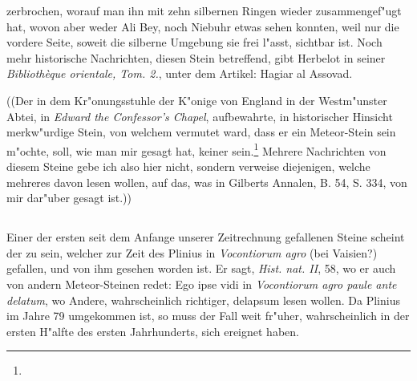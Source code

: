\documentclass[a4paper, 11pt, oneside, polutonikogreek, german]{article}
\begin{document}
zerbrochen, worauf man ihn mit zehn silbernen Ringen wieder zusammengef"ugt hat, wovon aber weder Ali Bey, noch Niebuhr etwas sehen konnten, weil nur die vordere Seite, soweit die silberne Umgebung sie frei l"asst, sichtbar ist. Noch mehr historische Nachrichten, diesen Stein betreffend, gibt Herbelot in seiner \emph{Bibliothèque orientale, Tom. 2.}, unter dem Artikel: Hagiar al Assovad.

((Der in dem Kr"onungsstuhle der K"onige von England in der Westm"unster Abtei, in \emph{Edward the Confessor's Chapel}, aufbewahrte, in historischer Hinsicht merkw"urdige Stein, von welchem vermutet ward, dass er ein Meteor-Stein sein m"ochte, soll, wie man mir gesagt hat, keiner sein.\footnote{} Mehrere Nachrichten von diesem Steine gebe ich also hier nicht, sondern verweise diejenigen, welche mehreres davon lesen wollen, auf das, was in Gilberts Annalen, B. 54, S. 334, von mir dar"uber gesagt ist.))
\subsection{}
\paragraph{}
Einer der ersten seit dem Anfange unserer Zeitrechnung gefallenen Steine scheint der zu sein, welcher zur Zeit des Plinius in \emph{Vocontiorum agro} (bei Vaisien?) gefallen, und von ihm gesehen worden ist. Er sagt, \emph{Hist. nat. II}, 58, wo er auch von andern Meteor-Steinen redet: Ego ipse vidi in \emph{Vocontiorum agro paule ante delatum}, wo Andere, wahrscheinlich richtiger, delapsum lesen wollen. Da Plinius im Jahre 79 umgekommen ist, so muss der Fall weit fr"uher, wahrscheinlich in der ersten H"alfte des ersten Jahrhunderts, sich ereignet haben.
\end{document}
